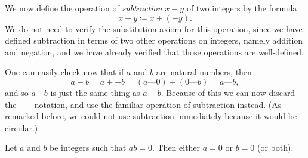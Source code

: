 \begin{note}
    We now define the operation of \emph{subtraction} \(x - y\) of two integers by the formula
    \[
        x - y \coloneqq x + (-y).
    \]
    We do not need to verify the substitution axiom for this operation, since we have defined subtraction in terms of two other operations on integers, namely addition and negation, and we have already verified that those operations are well-defined.
\end{note}

\begin{note}
    One can easily check now that if \(a\) and \(b\) are natural numbers, then
    \[
        a - b = a + -b = (a \text{---} 0) + (0 \text{---} b) = a \text{---} b,
    \]
    and so \(a \text{---} b\) is just the same thing as \(a - b\).
    Because of this we can now discard the ----- notation, and use the familiar operation of subtraction instead.
    (As remarked before, we could not use subtraction immediately because it would be circular.)
\end{note}

\begin{proposition}\label{4.1.8}
    Let \(a\) and \(b\) be integers such that \(ab = 0\).
    Then either \(a = 0\) or \(b = 0\) (or both).
\end{proposition}

